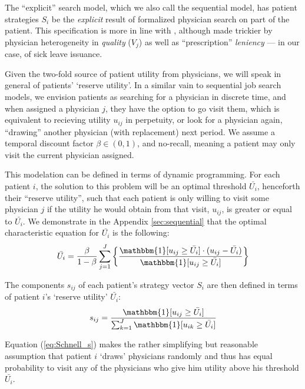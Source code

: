\documentclass[../main.tex]{subfiles}
\begin{document}
The ``explicit'' search model, which we also call the sequential model, has patient strategies $S_i$ be the \textit{explicit} result of formalized physician search on part of the patient. This specification is more in line with \cite{schnell2017physician}, although made trickier by physician heterogeneity in \textit{quality} ($V_j$) as well as ``prescription'' \textit{leniency} — in our case, of sick leave issuance.

Given the two-fold source of patient utility from physicians, we will speak in general of patients' `reserve utility'. In a similar vain to sequential job search models, we envision patients as searching for a physician in discrete time, and when assigned a physician $j$, they have the option to go visit them, which is equivalent to recieving utility $u_{ij}$ in perpetuity, or look for a physician again, ``drawing'' another physician (with replacement) next period. We assume a temporal discount factor $\beta \in (0,1)$, and no-recall, meaning a patient may only visit the current physician assigned.

This modelation can be defined in terms of dynamic programming. For each patient $i$, the solution to this problem will be an optimal threshold $\bar{U_i}$, henceforth their ``reserve utility'', such that each patient is only willing to visit some physician $j$ if the utility he would obtain from that visit, $u_{ij}$, is greater or equal to $\bar{U_i}$. We demonstrate in the Appendix \ref{sec:sequential} that the optimal characteristic equation for $\bar{U_i}$ is the following:
\begin{equation}
    \bar{U_i} = \frac{\beta}{1-\beta}  \sum_{j=1}^{J} \left\{ \frac{\mathbbm{1}[ u_{ij} \geq \bar{U_i} ] \cdot (u_{ij} - \bar{U_i})}{\mathbbm{1}[ u_{ij} \geq \bar{U_i} ]} \right\}
    \label{eq:seq4}  
\end{equation}



The components $s_{ij}$ of each patient's strategy vector $S_i$ are then defined in terms of patient $i$'s `reserve utility' $\bar{U_i}$:
\begin{equation}
    s_{ij} = \frac{\mathbbm{1}[ u_{ij} \geq \bar{U_i} ]}
    {\sum_{k=1}^{J} \mathbbm{1}[ u_{ik} \geq \bar{U_i} ]}
    \label{eq:Schnell_s}  
\end{equation}

Equation (\ref{eq:Schnell_s}) makes the rather simplifying but reasonable assumption that patient $i$ `draws' physicians randomly and thus has equal probability to visit any of the physicians who give him utility above his threshold $\bar{U_i}$.
\end{document}
